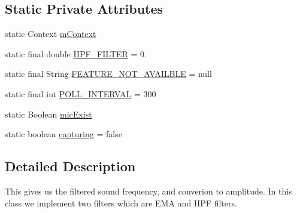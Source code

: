 \subsection*{Static Private Attributes}
\begin{DoxyCompactItemize}
\item 
static Context \hyperlink{classcs_1_1nsense_1_1microphone_1_1_sound_manager_a8a4a3c39bea101e98f8ce22decb085d5}{m\-Context}
\item 
static final double \hyperlink{classcs_1_1nsense_1_1microphone_1_1_sound_manager_a8b378eb0208222ff3d85c4f4d763962e}{H\-P\-F\-\_\-\-F\-I\-L\-T\-E\-R} = 0.
\item 
static final String \hyperlink{classcs_1_1nsense_1_1microphone_1_1_sound_manager_a319125567e085b17a66a3e651d304f66}{F\-E\-A\-T\-U\-R\-E\-\_\-\-N\-O\-T\-\_\-\-A\-V\-A\-I\-L\-B\-L\-E} = null
\item 
static final int \hyperlink{classcs_1_1nsense_1_1microphone_1_1_sound_manager_a8fda74d692b196fb3b2dc16a5ec23302}{P\-O\-L\-L\-\_\-\-I\-N\-T\-E\-R\-V\-A\-L} = 300
\item 
static Boolean \hyperlink{classcs_1_1nsense_1_1microphone_1_1_sound_manager_a84e00be6f0348b7352f0669635ce1bca}{mic\-Exist}
\item 
static boolean \hyperlink{classcs_1_1nsense_1_1microphone_1_1_sound_manager_aca562faaedb4f544f89803b63e10199b}{capturing} = false
\end{DoxyCompactItemize}


\subsection{Detailed Description}
This gives us the filtered sound frequency, and converion to amplitude. In this class we implement two filters which are E\-M\-A and H\-P\-F filters. 

